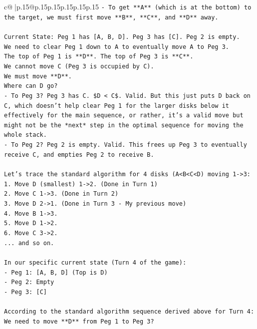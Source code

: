 \documentclass{article}
\begin{document}
{\begin{supertabular}{c@{$\;$}|p{.15\linewidth}@{}p{.15\linewidth}p{.15\linewidth}p{.15\linewidth}p{.15\linewidth}p{.15\linewidth}}
{{{\texttt{{-} To get **A** (which is at the bottom) to the target, we must first move **B**, **C**, and **D** away.} \\
\\ 
\texttt{Current State: Peg 1 has {[}A, B, D{]}. Peg 3 has {[}C{]}. Peg 2 is empty.} \\
\texttt{We need to clear Peg 1 down to A to eventually move A to Peg 3.} \\
\texttt{The top of Peg 1 is **D**. The top of Peg 3 is **C**.} \\
\texttt{We cannot move C (Peg 3 is occupied by C).} \\
\texttt{We must move **D**.} \\
\texttt{Where can D go?} \\
\texttt{{-} To Peg 3? Peg 3 has C. \$D < C\$. Valid. But this just puts D back on C, which doesn't help clear Peg 1 for the larger disks below it effectively for the main sequence, or rather, it's a valid move but might not be the *next* step in the optimal sequence for moving the whole stack.} \\
\texttt{{-} To Peg 2? Peg 2 is empty. Valid. This frees up Peg 3 to eventually receive C, and empties Peg 2 to receive B.} \\
\\ 
\texttt{Let's trace the standard algorithm for 4 disks (A<B<C<D) moving 1{-}>3:} \\
\texttt{1. Move D (smallest) 1{-}>2. (Done in Turn 1)} \\
\texttt{2. Move C 1{-}>3. (Done in Turn 2)} \\
\texttt{3. Move D 2{-}>1. (Done in Turn 3 {-} My previous move)} \\
\texttt{4. Move B 1{-}>3.} \\
\texttt{5. Move D 1{-}>2.} \\
\texttt{6. Move C 3{-}>2.} \\
\texttt{... and so on.} \\
\\ 
\texttt{In our specific current state (Turn 4 of the game):} \\
\texttt{{-} Peg 1: {[}A, B, D{]} (Top is D)} \\
\texttt{{-} Peg 2: Empty} \\
\texttt{{-} Peg 3: {[}C{]}} \\
\\ 
\texttt{According to the standard algorithm sequence derived above for Turn 4:} \\
\texttt{We need to move **D** from Peg 1 to Peg 3?} \\
}}}
\end{supertabular}}
\end{document}
